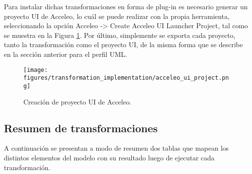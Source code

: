 Para instalar dichas transformaciones en forma de plug-in es necesario generar un proyecto UI de Acceleo, lo cuál se puede realizar con la propia herramienta, seleccionando la opción Acceleo -> Create Acceleo UI Launcher Project, tal como se muestra en la Figura \ref{fig:transformation:acceleo_ui_project}. Por último, simplemente se exporta cada proyecto, tanto la transformación como el proyecto UI, de la misma forma que se describe en la sección anterior para el perfil UML.

\begin{figure}[htbp]
    \centering
    \texttt{[image: figures/transformation\_implementation/acceleo\_ui\_project.png]}
    \caption{Creación de proyecto UI de Acceleo.}
    \label{fig:transformation:acceleo_ui_project}
\end{figure}

\subsection{Resumen de transformaciones}

A continuación se presentan a modo de resumen dos tablas que mapean los distintos elementos del modelo con su resultado luego de ejecutar cada transformación.


